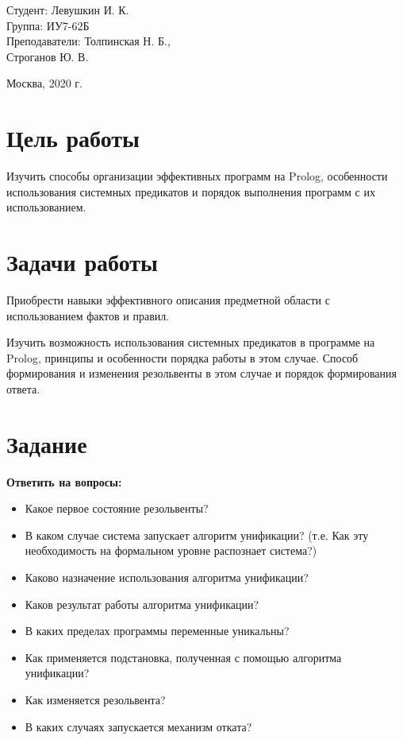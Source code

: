 \documentclass[a4paper,12pt]{article}
\begin{document}
	\vspace*{15mm} 	
	
	\large
	\begin{flushright}
		Студент: Левушкин И. К. \\
		Группа: ИУ7-62Б \\
		Преподаватели: Толпинская Н. Б., \\ Строганов Ю. В. \\
	\end{flushright}
	
	\vspace*{30mm}
	\begin{center}
		Москва, 2020 г.  
	\end{center}
	\thispagestyle{empty}
	
	
	\newpage
	
	\section*{Цель работы}
	
	Изучить способы организации эффективных программ на Prolog, особенности использования системных предикатов и порядок выполнения программ с их использованием.
	
	\section*{Задачи работы}
	
	Приобрести навыки эффективного описания предметной области с использованием фактов и правил.
	
	Изучить возможность использования системных предикатов в программе на Prolog, принципы и особенности порядка работы в этом случае. Способ формирования и изменения резольвенты в этом случае и порядок формирования ответа.
	
	
	\section*{Задание}
	
	{\bf Ответить на вопросы:}
	
	\begin{itemize}
		\item Какое первое состояние резольвенты?
		\item В каком случае система запускает алгоритм унификации? (т.е. Как эту необходимость на формальном уровне распознает система?)
		\item Каково назначение использования алгоритма унификации? 
		\item Каков  результат работы алгоритма унификации? 
		\item В каких пределах программы переменные уникальны? 
		\item Как применяется подстановка, полученная с помощью алгоритма унификации?
		\item Как изменяется резольвента?
		\item В каких случаях запускается механизм отката?
	\end{itemize}
	
\end{document}
